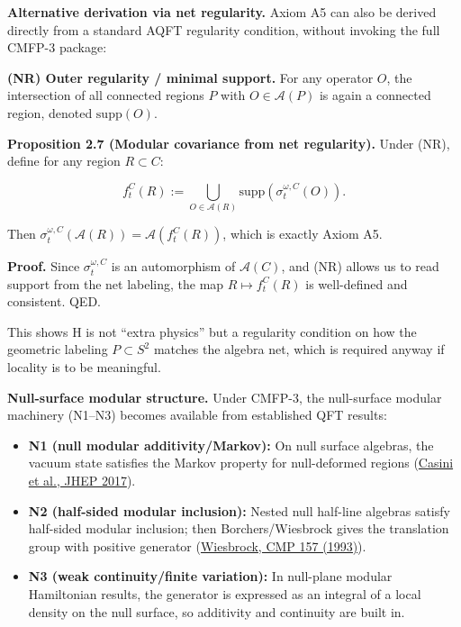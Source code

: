 \documentclass[11pt,a4paper]{article}
\theoremstyle{remark}
\begin{document}
\textbf{Alternative derivation via net regularity.} Axiom A5 can also be
derived directly from a standard AQFT regularity condition, without
invoking the full CMFP-3 package:

\textbf{(NR) Outer regularity / minimal support.} For any operator \(O\), the
intersection of all connected regions \(P\) with \(O \in \mathcal{A}(P)\) is
again a connected region, denoted \(\mathrm{supp}(O)\).

\textbf{Proposition 2.7 (Modular covariance from net regularity).} Under (NR),
define for any region \(R \subset C\):

\[
f_t^C(R) := \bigcup_{O \in \mathcal{A}(R)} \mathrm{supp}\left(\sigma_t^{\omega,C}(O)\right).
\]

Then \(\sigma_t^{\omega,C}(\mathcal{A}(R)) = \mathcal{A}(f_t^C(R))\), which
is exactly Axiom A5.

\textbf{Proof.} Since \(\sigma_t^{\omega,C}\) is an automorphism of \(\mathcal{A}(C)\),
and (NR) allows us to read support from the net labeling, the map
\(R \mapsto f_t^C(R)\) is well-defined and consistent. QED.

This shows H is not ``extra physics'' but a regularity condition on how the
geometric labeling \(P \subset S^2\) matches the algebra net, which is
required anyway if locality is to be meaningful.

\textbf{Null-surface modular structure.} Under CMFP-3, the null-surface modular
machinery (N1--N3) becomes available from established QFT results:

\begin{itemize}
\item
  \textbf{N1 (null modular additivity/Markov):} On null surface algebras, the vacuum
  state satisfies the Markov property for null-deformed regions
  (\href{https://arxiv.org/abs/1703.10656}{Casini et al., JHEP 2017}).
\item
  \textbf{N2 (half-sided modular inclusion):} Nested null half-line algebras satisfy
  half-sided modular inclusion; then Borchers/Wiesbrock gives the translation
  group with positive generator
  (\href{https://projecteuclid.org/journals/communications-in-mathematical-physics/volume-157/issue-1/Half-sided-modular-inclusions-of-von-Neumann-algebras/cmp/1104253848.pdf}{Wiesbrock, CMP 157 (1993)}).
\item
  \textbf{N3 (weak continuity/finite variation):} In null-plane modular Hamiltonian
  results, the generator is expressed as an integral of a local density on the
  null surface, so additivity and continuity are built in.
\end{itemize}
\end{document}

